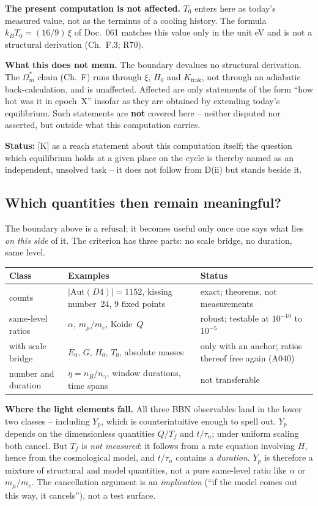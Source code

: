 \textbf{The present computation is not affected.} $T_0$ enters
here as today's measured value, not as the terminus of a cooling
history. The formula $k_BT_0 = (16/9)\,\xi$ of Doc.~061 matches
this value only in the unit eV and is not a structural derivation
(Ch.~F.3; R70).

\textbf{What this does not mean.} The boundary devalues no
structural derivation. The $\Omega_m^{*}$ chain (Ch.~F) runs
through $\xi$, $H_0$ and $K_\text{frak}$, not through an adiabatic
back-calculation, and is unaffected. Affected are only statements
of the form \enquote{how hot was it in epoch~X} insofar as they
are obtained by extending today's equilibrium. Such statements are
\textbf{not} covered here -- neither disputed nor asserted, but
outside what this computation carries.

\textbf{Status:} [K] as a reach statement about this computation
itself; the question which equilibrium holds at a given place on
the cycle is thereby named as an independent, unsolved task -- it
does not follow from D(ii) but stands beside it.

\subsection*{Which quantities then remain meaningful?}

The boundary above is a refusal; it becomes useful only once one
says what lies \emph{on this side} of it. The criterion has three
parts: no scale bridge, no duration, same level.

\begin{center}
\begin{tabular}{llp{4.6cm}}
\toprule
Class & Examples & Status \\
\midrule
counts & $|\text{Aut}(D4)| = 1152$, kissing number~24,
  9 fixed points & exact; theorems, not measurements \\
same-level ratios & $\alpha$, $m_\mu/m_e$, Koide~$Q$ &
  robust; testable at $10^{-10}$ to $10^{-5}$ \\
with scale bridge & $E_0$, $G$, $H_0$, $T_0$, absolute masses &
  only with an anchor; ratios thereof free again (A040) \\
number and duration & $\eta = n_B/n_\gamma$, window durations,
  time spans & not transferable \\
\bottomrule
\end{tabular}
\end{center}

\textbf{Where the light elements fall.} All three BBN observables
land in the lower two classes -- including $Y_p$, which is
counterintuitive enough to spell out. $Y_p$ depends on the
dimensionless quantities $Q/T_f$ and $t/\tau_n$; under uniform
scaling both cancel. But $T_f$ is \emph{not measured}: it follows
from a rate equation involving $H$, hence from the cosmological
model, and $t/\tau_n$ contains a \emph{duration}. $Y_p$ is
therefore a mixture of structural and model quantities, not a
pure same-level ratio like $\alpha$ or $m_\mu/m_e$. The
cancellation argument is an \emph{implication}
(\enquote{if the model comes out this way, it cancels}), not a
test surface.

